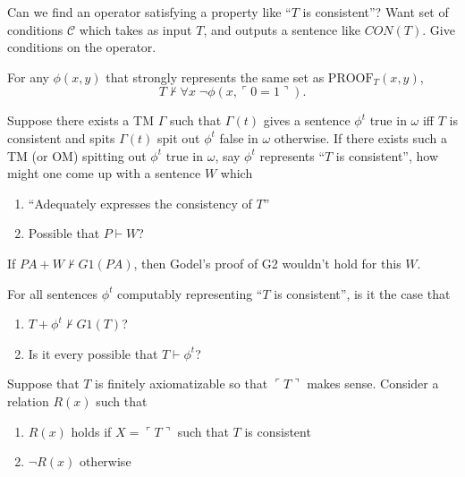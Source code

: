 \begin{goal}[Operator]
  Can we find an operator satisfying a property like ``$T$ is consistent''?
  Want set of conditions $\mathcal{C}$ which takes as input $T$, and
  outputs a sentence like $CON(T)$. Give conditions on the operator.
\end{goal}

\begin{fact}
  For any $\phi(x,y)$ that strongly represents the same set as
  $\text{PROOF}_T(x,y)$,
  \[T \not\vdash \forall x\; \neg\phi(x, \ulcorner 0=1\urcorner).\]
\end{fact}

\begin{question}
  Suppose there exists a TM $\Gamma$ such that $\Gamma(t)$ gives a sentence
  $\phi^t$ true in $\omega$ iff $T$ is consistent and spits $\Gamma(t)$
  spit out $\phi^t$ false in $\omega$ otherwise. If there exists such a TM
  (or OM) spitting out $\phi^t$ true in $\omega$, say $\phi^t$ represents
  ``$T$ is consistent'', how might one come up with a sentence $W$ which

  \begin{enumerate}
    \item ``Adequately expresses the consistency of $T$''
    \item Possible that $P \vdash W$?
  \end{enumerate}

  If $PA+W \not\vdash G1(PA)$, then Godel's proof of G2 wouldn't hold for
  this $W$.
\end{question}

\begin{question}
  For all sentences $\phi^t$ computably representing ``$T$ is consistent'',
  is it the case that
  \begin{enumerate}
    \item $T+\phi^t \not\vdash G1(T)$?
    \item Is it every possible that $T \vdash \phi^t$?
  \end{enumerate}
\end{question}

\begin{question}
  Suppose that $T$ is finitely axiomatizable so that $\ulcorner T\urcorner$
  makes sense. Consider a relation $R(x)$ such that
  \begin{enumerate}
    \item $R(x)$ holds if $X=\ulcorner T\urcorner$ such that $T$ is
      consistent
    \item $\neg R(x)$ otherwise
  \end{enumerate}
\end{question}
